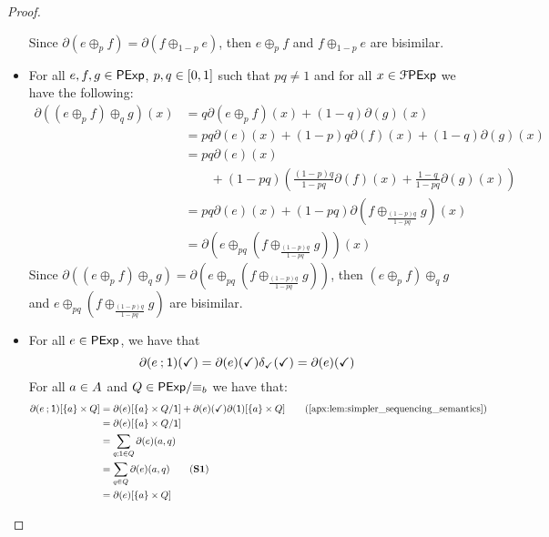 \begin{proof}
\begin{itemize}
        Since $\partial(e \oplus_p f) = \partial(f \oplus_{1-p} e )$, then $e \oplus_p f$ and $f \oplus_{1-p} e$ are bisimilar.

        \item[] 
        For all $e,f,g  \in \mathsf{PExp}$, $p,q \in \interval{0}{1}$ such that $pq \neq 1$ and for all $x \in\mathcal{F} \mathsf{PExp}$ we have the following:
        \begin{align*}
            \partial\left((e \oplus_p f) \oplus_{q} g \right)(x) &= q\partial(e \oplus_p f)(x) + (1-q) \partial(g)(x) \\
            &=pq \partial(e)(x) + (1-p)q \partial(f)(x) + (1-q) \partial(g)(x)\\
            &=pq \partial(e)(x)\\ &\quad\quad+ (1-pq)\left(\frac{(1-p)q}{1-pq} \partial(f)(x) + \frac{1-q}{1-pq} \partial(g)(x)\right)\\
            &=pq \partial(e)(x) + (1-pq)\partial\left(f \oplus_{\frac{{(1-p)}q}{1-pq}}g \right)(x)\\
            &=\partial\left(e \oplus_{pq} \left( f \oplus_{\frac{{(1-p)}q}{1-pq}} g\right)\right)(x)
        \end{align*}
        Since $\partial\left((e \oplus_p f) \oplus_{q} g \right) = \partial\left(e \oplus_{pq} \left( f \oplus_{\frac{(1-p)q}{1-pq}} g\right)\right)$, then $(e \oplus_p f) \oplus_{q} g$ and $e \oplus_{pq} \left( f \oplus_{\frac{(1-p)q}{1-pq}} g\right)$ are bisimilar.

        \item[] 
        For all $e \in \mathsf{PExp}$, we have that
        $$\partial(e \mathbin{;} \mathsf{1})(\checkmark) = \partial(e)(\checkmark)\delta_{\checkmark}(\checkmark)=\partial(e)(\checkmark)$$
        For all $a \in {A}$ and $Q \in {\mathsf{PExp}}/{\equiv_b}$ we have that:
        \begin{align*}
            \partial(e \seq \one)[\{a\} \times Q] &= \partial(e)[\{a\} \times {Q}/{\one}] + \partial(e)(\checkmark)\partial(\one)[\{a\} \times Q] \tag{\Cref{apx:lem:simpler_sequencing_semantics}}\\
            &= \partial(e)[\{a\} \times {Q}/{\one}] \\
            &= \sum_{q \seq \one \in Q}\partial(e)(a,q) \\
            &= \sum_{q \in Q}\partial(e)(a,q) \tag{\textbf{S1}}\\
            &= \partial(e)[\{a\} \times Q]
        \end{align*}


\end{itemize}
\end{proof}
